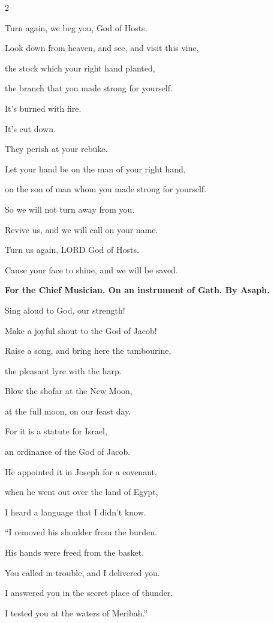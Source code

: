 \begin{multicols}{2}
	
	\myverse{}Turn again, we beg you, God of Hosts.
	
	Look down from heaven, and see, and visit this vine,
	
	
	\myverse{}the stock which your right hand planted,
	
	the branch that you made strong for yourself.
	
	
	\myverse{}It’s burned with fire.
	
	It’s cut down.
	
	They perish at your rebuke.
	
	
	\myverse{}Let your hand be on the man of your right hand,
	
	on the son of man whom you made strong for yourself.
	
	
	\myverse{}So we will not turn away from you.
	
	Revive us, and we will call on your name.
	
	
	\myverse{}Turn us again, LORD God of Hosts.
	
	Cause your face to shine, and we will be saved.
	
	
	\mychapter{}\textbf{For the Chief Musician. On an instrument of Gath. By Asaph.}
	
	\myverse*{}Sing aloud to God, our strength!
	
	Make a joyful shout to the God of Jacob!
	
	
	\myverse{}Raise a song, and bring here the tambourine,
	
	the pleasant lyre with the harp.
	
	
	\myverse{}Blow the shofar at the New Moon,
	
	at the full moon, on our feast day.
	
	
	\myverse{}For it is a statute for Israel,
	
	an ordinance of the God of Jacob.
	
	
	\myverse{}He appointed it in Joseph for a covenant,
	
	when he went out over the land of Egypt,
	
	I heard a language that I didn’t know.
	
	
	\myverse{}“I removed his shoulder from the burden.
	
	His hands were freed from the basket.
	
	
	\myverse{}You called in trouble, and I delivered you.
	
	I answered you in the secret place of thunder.
	
	I tested you at the waters of Meribah.”
	

\end{multicols}
